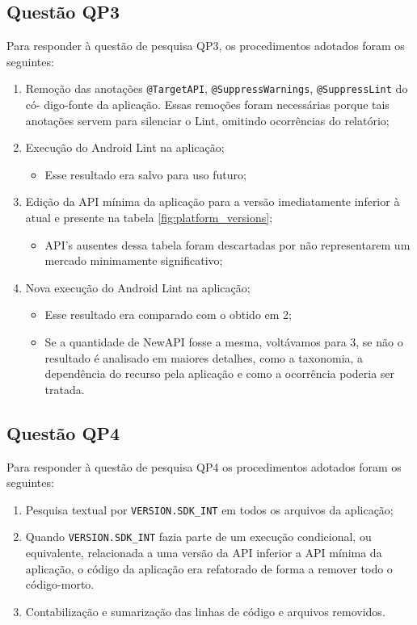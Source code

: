 \subsection{Questão QP3}
Para responder à questão de pesquisa QP3, os procedimentos adotados foram os
seguintes:

\begin{enumerate}
	\item Remoção das anotações \texttt{@TargetAPI}, \texttt{@SuppressWarnings},
		 	\texttt{@SuppressLint} do có- digo-fonte da aplicação. Essas remoções foram
		 	 necessárias porque tais anotações servem para silenciar o Lint, omitindo 
		 	 ocorrências do relatório; 
	\item Execução do Android Lint na aplicação;
		\begin{itemize}
			\item Esse resultado era salvo para uso futuro;
		\end{itemize}
	\item Edição da API mínima da aplicação para a versão imediatamente inferior à atual
		e presente na tabela \ref{fig:platform_versions};
		\begin{itemize}
			\item API's ausentes dessa tabela foram descartadas por não representarem
			um mercado minimamente significativo;
		\end{itemize}
	\item Nova execução do Android Lint na aplicação;
		\begin{itemize}
			\item Esse resultado era comparado com o obtido em 2;
			\item Se a quantidade de NewAPI fosse a mesma, voltávamos para 3, se não
			o resultado é analisado em maiores detalhes, como a taxonomia, a dependência
			do recurso pela aplicação e como a ocorrência poderia ser tratada.
		\end{itemize}
\end{enumerate}

\subsection{Questão QP4}
Para responder à questão de pesquisa QP4 os procedimentos adotados foram os seguintes:

\begin{enumerate}
	\item Pesquisa textual por \texttt{VERSION.SDK\_INT} em todos os arquivos da
		aplicação;
	\item Quando \texttt{VERSION.SDK\_INT} fazia parte de um execução condicional, ou equivalente, relacionada a uma versão da API inferior a API mínima da aplicação, o código da aplicação era refatorado de forma a remover todo o código-morto.
	\item Contabilização e sumarização das linhas de código e arquivos removidos.
\end{enumerate}


